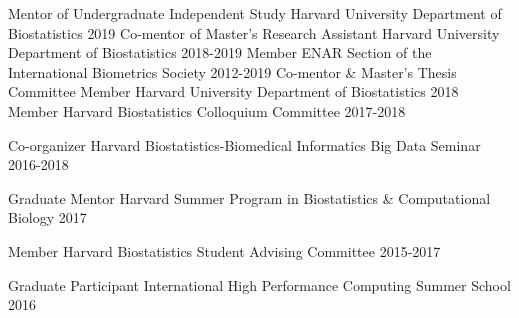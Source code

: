 

\begin{cvinvolves}
	\cvinvolve
	{Mentor of Undergraduate Independent Study} %
	{Harvard University Department of Biostatistics} %
	{} %
	{2019} %
	\cvinvolve
	{Co-mentor of Master's Research Assistant} %
	{Harvard University Department of Biostatistics} %
	{} %
	{2018-2019} %
\cvinvolve
{Member} %
{ENAR Section of the International Biometrics Society} %
{} %
{2012-2019} %
\cvinvolve
{Co-mentor \& Master's Thesis Committee Member} %
{Harvard University Department of Biostatistics} %
{} %
{2018} %
  \cvinvolve
    {Member} %
    {Harvard Biostatistics Colloquium Committee} %
    {} %
    {2017-2018} %
   
   \cvinvolve
   {Co-organizer} %
   {Harvard Biostatistics-Biomedical Informatics Big Data Seminar} %
   {} %
   {2016-2018} %
    
    \cvinvolve
    {Graduate Mentor} %
    {Harvard Summer Program in Biostatistics \& Computational Biology} %
    {} %
    {2017} %

  \cvinvolve
    {Member} %
    {Harvard Biostatistics Student Advising Committee} %
    {} %
    {2015-2017} %

\cvinvolve
{Graduate Participant} %
{International High Performance Computing Summer School} %
{} %
{2016} %


\end{cvinvolves}

